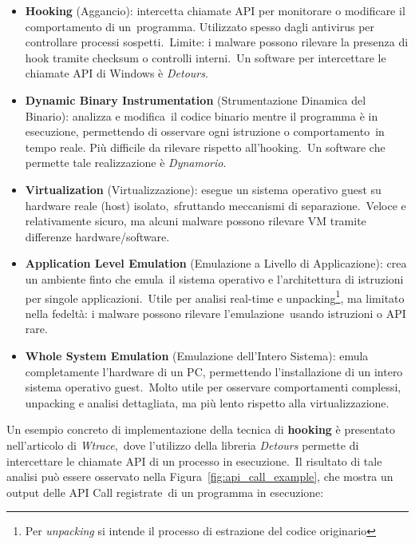 \begin{itemize}
      \item \textbf{Hooking} (Aggancio): intercetta chiamate API per monitorare o modificare il comportamento di un\
            programma. Utilizzato spesso dagli antivirus per controllare processi sospetti.\
            Limite: i malware possono rilevare la presenza di hook tramite checksum o controlli interni.\
            Un software per intercettare le chiamate API di Windows è \textit{Detours}.

      \item \textbf{Dynamic Binary Instrumentation} (Strumentazione Dinamica del Binario): analizza e modifica\
            il codice binario mentre il programma è in esecuzione, permettendo di osservare ogni istruzione o comportamento\
            in tempo reale. Più difficile da rilevare rispetto all'hooking.\
            Un software che permette tale realizzazione è \textit{Dynamorio}.\

      \item \textbf{Virtualization} (Virtualizzazione): esegue un sistema operativo guest su hardware reale (host) isolato,\
            sfruttando meccanismi di separazione.\
            Veloce e relativamente sicuro, ma alcuni malware possono rilevare VM tramite differenze hardware/software.

      \item \textbf{Application Level Emulation} (Emulazione a Livello di Applicazione): crea un ambiente finto che emula\
            il sistema operativo e l'architettura di istruzioni per singole applicazioni.\
            Utile per analisi real-time e unpacking\footnote{Per \textit{unpacking} si intende il processo di estrazione del codice originario}, ma limitato nella fedeltà: i malware possono rilevare l'emulazione\
            usando istruzioni o API rare.

      \item \textbf{Whole System Emulation} (Emulazione dell'Intero Sistema): emula completamente l'hardware di un PC,
            permettendo l'installazione di un intero sistema operativo guest.\
            Molto utile per osservare comportamenti complessi, unpacking e analisi dettagliata, ma più lento rispetto alla virtualizzazione.
\end{itemize}

Un esempio concreto di implementazione della tecnica di \textbf{hooking} è presentato nell'articolo di \textit{Wtrace},\
dove l'utilizzo della libreria \textit{Detours} permette di intercettare le chiamate API di un processo in esecuzione.\
Il risultato di tale analisi può essere osservato nella Figura~\ref{fig:api_call_example}, che mostra un output delle API Call registrate\
di un programma in esecuzione:\

